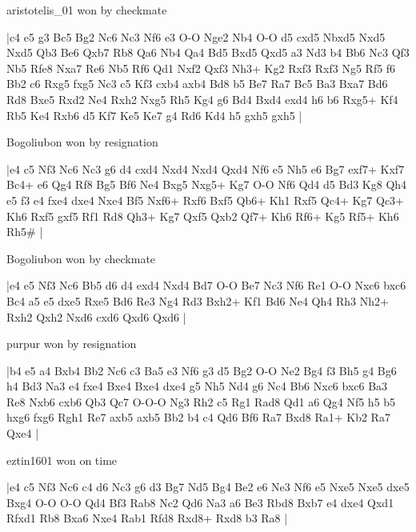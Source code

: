 \showboard

aristotelis\_01 won by checkmate

\makegametitle
|c4 e5 g3 Bc5 Bg2 Nc6 Nc3 Nf6 e3 O-O Nge2 Nb4 O-O d5 cxd5 Nbxd5 Nxd5 Nxd5 Qb3 Be6 Qxb7 Rb8 Qa6 Nb4 Qa4 Bd5 Bxd5 Qxd5 a3 Nd3 b4 Bb6 Nc3 Qf3 Nb5 Rfe8 Nxa7 Re6 Nb5 Rf6 Qd1 Nxf2 Qxf3 Nh3+ Kg2 Rxf3 Rxf3 Ng5 Rf5 f6 Bb2 c6 Rxg5 fxg5 Nc3 c5 Kf3 cxb4 axb4 Bd8 b5 Be7 Ra7 Bc5 Ba3 Bxa7 Bd6 Rd8 Bxe5 Rxd2 Ne4 Rxh2 Nxg5 Rh5 Kg4 g6 Bd4 Bxd4 exd4 h6 b6 Rxg5+ Kf4 Rb5 Ke4 Rxb6 d5 Kf7 Ke5 Ke7 g4 Rd6 Kd4 h5 gxh5 gxh5  |

\showboard

Bogoliubon won by resignation

\makegametitle
|e4 c5 Nf3 Nc6 Nc3 g6 d4 cxd4 Nxd4 Nxd4 Qxd4 Nf6 e5 Nh5 e6 Bg7 exf7+ Kxf7 Bc4+ e6 Qg4 Rf8 Bg5 Bf6 Ne4 Bxg5 Nxg5+ Kg7 O-O Nf6 Qd4 d5 Bd3 Kg8 Qh4 e5 f3 e4 fxe4 dxe4 Nxe4 Bf5 Nxf6+ Rxf6 Bxf5 Qb6+ Kh1 Rxf5 Qc4+ Kg7 Qc3+ Kh6 Rxf5 gxf5 Rf1 Rd8 Qh3+ Kg7 Qxf5 Qxb2 Qf7+ Kh6 Rf6+ Kg5 Rf5+ Kh6 Rh5\#  |

\showboard

Bogoliubon won by checkmate

\makegametitle
|e4 e5 Nf3 Nc6 Bb5 d6 d4 exd4 Nxd4 Bd7 O-O Be7 Nc3 Nf6 Re1 O-O Nxc6 bxc6 Bc4 a5 e5 dxe5 Rxe5 Bd6 Re3 Ng4 Rd3 Bxh2+ Kf1 Bd6 Ne4 Qh4 Rh3 Nh2+ Rxh2 Qxh2 Nxd6 cxd6 Qxd6 Qxd6  |

\showboard

purpur won by resignation

\makegametitle
|b4 e5 a4 Bxb4 Bb2 Nc6 c3 Ba5 e3 Nf6 g3 d5 Bg2 O-O Ne2 Bg4 f3 Bh5 g4 Bg6 h4 Bd3 Na3 e4 fxe4 Bxe4 Bxe4 dxe4 g5 Nh5 Nd4 g6 Nc4 Bb6 Nxc6 bxc6 Ba3 Re8 Nxb6 cxb6 Qb3 Qc7 O-O-O Ng3 Rh2 c5 Rg1 Rad8 Qd1 a6 Qg4 Nf5 h5 b5 hxg6 fxg6 Rgh1 Re7 axb5 axb5 Bb2 b4 c4 Qd6 Bf6 Ra7 Bxd8 Ra1+ Kb2 Ra7 Qxe4  |

\showboard

eztin1601 won on time

\makegametitle
|e4 c5 Nf3 Nc6 c4 d6 Nc3 g6 d3 Bg7 Nd5 Bg4 Be2 e6 Ne3 Nf6 e5 Nxe5 Nxe5 dxe5 Bxg4 O-O O-O Qd4 Bf3 Rab8 Nc2 Qd6 Na3 a6 Be3 Rbd8 Bxb7 e4 dxe4 Qxd1 Rfxd1 Rb8 Bxa6 Nxe4 Rab1 Rfd8 Rxd8+ Rxd8 b3 Ra8  |

